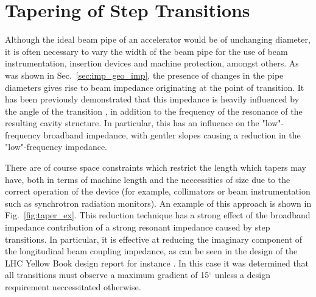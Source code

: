 \section{Tapering of Step Transitions}
\label{sec:step_ins}

Although the ideal beam pipe of an accelerator would be of unchanging diameter, it is often necessary to vary the width of the beam pipe for the use of beam instrumentation, insertion devices and machine protection, amongst others. As was shown in Sec.~\ref{sec:imp_geo_imp}, the presence of changes in the pipe diameters gives rise to beam impedance originating at the point of transition. It has been previously demonstrated that this impedance is heavily influenced by the angle of the transition \cite{Podobedov:TaperedImp}, in addition to the frequency of the resonance of the resulting cavity structure. In particular, this has an influence on the "low"-frequency broadband impedance, with gentler slopes causing a reduction in the "low"-frequency impedance. 

There are of course space constraints which restrict the length which tapers may have, both in terms of machine length and the neccessities of size due to the correct operation of the device (for example, collimators or beam instrumentation such as synchrotron radiation monitors). An example of this approach is shown in Fig.~\ref{fig:taper_ex}. This reduction technique has a strong effect of the broadband impedance contribution of a strong resonant impedance caused by step transitions. In particular, it is effective at reducing the imaginary component of the longitudinal beam coupling impedance, as can be seen in the design of the LHC Yellow Book design report for instance \cite{Ruggiero:LHCColEff}. In this case it was determined that all transitions must observe a maximum gradient of 15$^{\circ}$ unless a design requirement neccessitated otherwise.

